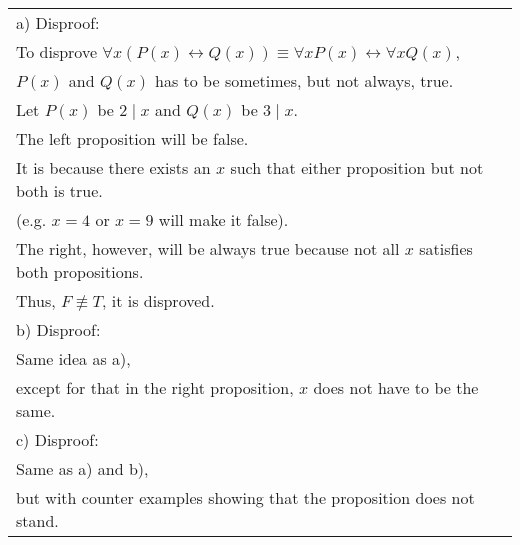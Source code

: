 \documentclass[12pt]{exam}
\begin{document}
\begin{solution}
	\begin{tabular}{ll}
		a) Disproof:                                                                                             \\
		To disprove $\forall x(P(x) \leftrightarrow Q(x)) \equiv \forall x P(x) \leftrightarrow \forall x Q(x)$, \\
		$P(x)$ and $Q(x)$ has to be sometimes, but not always, true.                                             \\
		Let $P(x)$ be $2 \mid x$ and $Q(x)$ be $3 \mid x$.                                                       \\
		The left proposition will be false.                                                                      \\
		It is because there exists an $x$ such that either proposition but not both is true.                     \\
		(e.g. $x=4$ or $x=9$ will make it false).                                                                \\
		The right, however, will be always true because not all $x$ satisfies both propositions.                 \\
		Thus, $F \not \equiv T$, it is disproved.                                                                \\
		b) Disproof:                                                                                             \\
		Same idea as a),                                                                                         \\
		except for that in the right proposition, $x$ does not have to be the same.                              \\
		c) Disproof:                                                                                             \\
		Same as a) and b),                                                                                       \\
		but with counter examples showing that the proposition does not stand.
	\end{tabular}
\end{solution}
\end{document}
